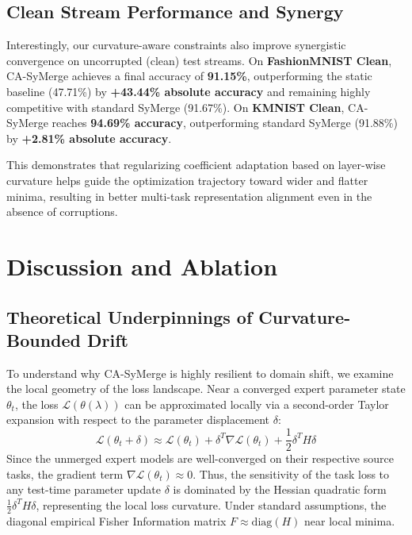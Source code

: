 \documentclass{article}
\begin{document}
\subsection{Clean Stream Performance and Synergy}
Interestingly, our curvature-aware constraints also improve synergistic convergence on uncorrupted (clean) test streams. 
On \textbf{FashionMNIST Clean}, CA-SyMerge achieves a final accuracy of \textbf{91.15\%}, outperforming the static baseline (47.71\%) by \textbf{+43.44\% absolute accuracy} and remaining highly competitive with standard SyMerge (91.67\%). On \textbf{KMNIST Clean}, CA-SyMerge reaches \textbf{94.69\% accuracy}, outperforming standard SyMerge (91.88\%) by \textbf{+2.81\% absolute accuracy}.

This demonstrates that regularizing coefficient adaptation based on layer-wise curvature helps guide the optimization trajectory toward wider and flatter minima, resulting in better multi-task representation alignment even in the absence of corruptions.

\section{Discussion and Ablation}
\label{sec:discussion}

\subsection{Theoretical Underpinnings of Curvature-Bounded Drift}
To understand why CA-SyMerge is highly resilient to domain shift, we examine the local geometry of the loss landscape. Near a converged expert parameter state $\theta_t$, the loss $\mathcal{L}(\theta(\lambda))$ can be approximated locally via a second-order Taylor expansion with respect to the parameter displacement $\delta$:
\begin{equation}
    \mathcal{L}(\theta_t + \delta) \approx \mathcal{L}(\theta_t) + \delta^T \nabla \mathcal{L}(\theta_t) + \frac{1}{2} \delta^T H \delta
\end{equation}
Since the unmerged expert models are well-converged on their respective source tasks, the gradient term $\nabla \mathcal{L}(\theta_t) \approx 0$. Thus, the sensitivity of the task loss to any test-time parameter update $\delta$ is dominated by the Hessian quadratic form $\frac{1}{2} \delta^T H \delta$, representing the local loss curvature. Under standard assumptions, the diagonal empirical Fisher Information matrix $F \approx \text{diag}(H)$ near local minima. 
\end{document}
